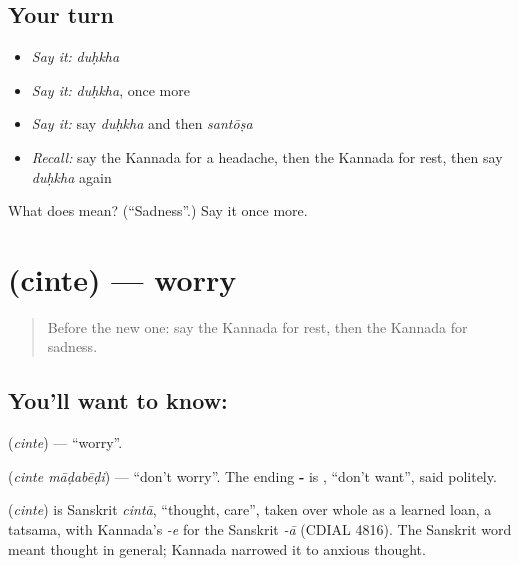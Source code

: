 \subsection*{Your turn}
\begin{itemize}
\raggedright
  \item \emph{Say it:} \emph{duḥkha}
  \item \emph{Say it:} \emph{duḥkha}, once more
  \item \emph{Say it:} say \emph{duḥkha} and then \emph{santōṣa}
  \item \emph{Recall:} say the Kannada for a headache, then the Kannada for rest, then say \emph{duḥkha} again
\end{itemize}

\begin{tcolorbox}[breakable,colback=teal!4,colframe=teal!35!black,title={Before you move on}]
What does  mean? (\textquotedblleft{}Sadness\textquotedblright{}.) Say it once more.
\end{tcolorbox}
\section[\texorpdfstring{\kn{ಚಿಂತೆ} (cinte)}{ಚಿಂತೆ (cinte)}]{ (cinte) — worry}

\label{lesson:KA-C83-worry}



\begin{quote}
Before the new one: say the Kannada for rest, then the Kannada for sadness.
\end{quote}

\subsection*{You'll want to know: }
\textbf{} (\emph{cinte}) — \textquotedblleft{}worry\textquotedblright{}.

\textbf{ } (\emph{cinte māḍabēḍi}) — \textquotedblleft{}don't worry\textquotedblright{}. The ending \textbf{‑} is \textbf{}, \textquotedblleft{}don't want\textquotedblright{}, said politely.

\begin{cousinweb}
\textbf{} (\emph{cinte}) is Sanskrit \emph{cintā}, \textquotedblleft{}thought, care\textquotedblright{}, taken over whole as a learned loan, a tatsama, with Kannada's \emph{-e} for the Sanskrit \emph{-ā} (CDIAL 4816). The Sanskrit word meant thought in general; Kannada narrowed it to anxious thought.
\end{cousinweb}

